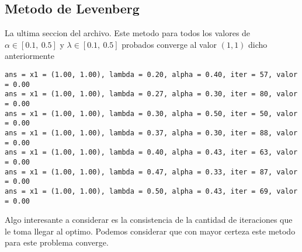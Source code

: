 \documentclass[letterpaper]{article}
\begin{document}
\subsection*{Metodo de Levenberg}
La ultima seccion del archivo. Este metodo para todos los valores de
\(\alpha \in [0.1,\ 0.5]\) y \(\lambda \in [0.1,\ 0.5]\) probados
converge al valor \((1,1)\) dicho anteriormente
\begin{verbatim}
ans = x1 = (1.00, 1.00), lambda = 0.20, alpha = 0.40, iter = 57, valor = 0.00
ans = x1 = (1.00, 1.00), lambda = 0.27, alpha = 0.30, iter = 80, valor = 0.00
ans = x1 = (1.00, 1.00), lambda = 0.30, alpha = 0.50, iter = 50, valor = 0.00
ans = x1 = (1.00, 1.00), lambda = 0.37, alpha = 0.30, iter = 88, valor = 0.00
ans = x1 = (1.00, 1.00), lambda = 0.40, alpha = 0.43, iter = 63, valor = 0.00
ans = x1 = (1.00, 1.00), lambda = 0.47, alpha = 0.33, iter = 87, valor = 0.00
ans = x1 = (1.00, 1.00), lambda = 0.50, alpha = 0.43, iter = 69, valor = 0.00
\end{verbatim}
Algo interesante a considerar es la consistencia de la cantidad de
iteraciones que le toma llegar al optimo. Podemos considerar que con
mayor certeza este metodo para este problema converge.
\end{document}
